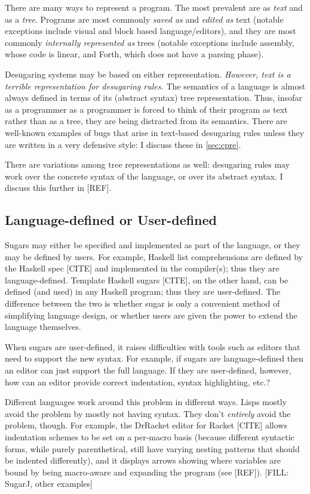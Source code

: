 There are many ways to represent a program. The most prevalent are as
\emph{text} and as a \emph{tree}. Programs are most commonly
\emph{saved as} and \emph{edited as} text (notable exceptions include
visual and block based language/editors), and they are most commonly
\emph{internally represented as} trees (notable exceptions include
assembly, whose code is linear, and Forth, which does not have a
parsing phase).

Desugaring systems may be based on either representation.
\emph{However, text is a terrible representation for desugaring rules.}
The semantics of a language is almost always defined in terms of its
(abstract syntax) tree representation. Thus, insofar as a programmer
as a programmer is forced to think of their program as text rather
than as a tree, they are being distracted from its semantics. There
are well-known examples of bugs that arise in text-based desugaring
rules unless they are written in a very defensive style: I discuss
these in \ref{sec:cpre}.

There are variations among tree representations as well: desugaring
rules may work over the concrete syntax of the language, or over its
abstract syntax. I discuss this further in [REF].

\subsection{Language-defined or User-defined}

Sugars may either be specified and implemented as part of the
language, or they may be defined by users. For example, Haskell list
comprehensions are defined by the Haskell spec [CITE] and implemented
in the compiler(s); thus they are language-defined. Template Haskell
sugars [CITE], on the other hand, can be defined (and used) in any
Haskell program; thus they are user-defined. The difference between the two
is whether sugar is only a convenient method of simplifying language
design, or whether users are given the power to extend the language
themselves.

When sugars are user-defined, it raises difficulties with tools such
as editors that need to support the new syntax. For example, if sugars
are language-defined then an editor can just support the full
language. If they are user-defined, however, how can an editor provide
correct indentation, syntax highlighting, etc.?

Different languages work around this problem in different ways. Lisps
mostly avoid the problem by mostly not having syntax. They don't
\emph{entirely} avoid the problem, though. For example, the DrRacket editor for
Racket [CITE] allows indentation schemes to be set on a per-macro
basis (because different syntactic forms, while purely parenthetical,
still have varying nesting patterns that should be indented
differently), and it displays arrows showing where variables are bound
by being macro-aware and expanding the program (see [REF]).
[FILL: SugarJ, other examples]


